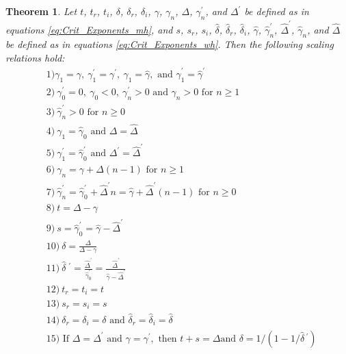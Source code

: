 \documentclass[english,12pt]{ttuthes}
\newtheorem{theorem}{Theorem}[chapter]
\newcommand{\gh}{\hat{\gamma}}
\newcommand{\Dh}{\hat{\Delta}}
\newcommand{\dha}{\hat{\delta}}
\begin{document}
\begin{theorem} \label{thm:Crit_Theory_m_w}
  Let $t$, $t_r$, $t_i$, $\delta$, $\delta_r$, $\delta_i$, $\gamma$, $\gamma_n$, $\Delta$, $\gamma_n^\prime$,
  and $\Delta^\prime$ be   defined as in equations \eqref{eq:Crit_Exponents_mh},
  and $s$, $s_r$, $s_i$, $\dha$, $\dha_r$, $\dha_i$, $\gh$, $\gh_n^\prime$,
  $\Dh^\prime$, $\gh_n$, and $\Dh$ be defined as in equations
  \eqref{eq:Crit_Exponents_wh}. Then the following scaling relations
  hold:
%  
  \begin{align*}   
   &1) \gamma_1=\gamma, \ \gamma_1^\prime=\gamma^\prime, \ \gh_1=\gh, \text{ and } \gh_1^\prime=\gh^\prime\\
   &2) \ \gamma_0^\prime=0, \ \gamma_0<0, \ \gamma_n^\prime>0 \text{ and } \gamma_n>0 \text{ for } n\geq1\\
   &3) \ \gh_n^\prime>0 \text{ for } n\geq0\\
   &4) \ \gamma_1=\gh_0 \text{ and } \Delta=\Dh\\
   &5) \ \gamma_1^\prime=\gh_0^\prime \text{ and } \Delta^\prime=\Dh^\prime \\
   &6) \ \gamma_n=\gamma+\Delta(n-1) \text{ for } n\geq1 \\
   &7) \ \gh_n^\prime=\gh_0^\prime+\Dh^\prime n=\gh+\Dh^\prime(n-1) \text{ for } n\geq0 \\
   &8) \ t=\Delta-\gamma \\
   &9) \ s=\gh_0^\prime=\gh-\Dh^\prime \\
   &10) \ \delta=\frac{\Delta}{\Delta-\gamma} \\
   &11) \ \dha\;^\prime=\frac{\Dh^\prime}{\gh_0^\prime}=\frac{\Dh^\prime}{\gh-\Dh^\prime} \\
   &12) \ t_r=t_i=t \\
   &13) \ s_r=s_i=s \\
   &14) \ \delta_r=\delta_i=\delta \text{ and } \dha_r=\dha_i=\dha \\
   &15) \text{ If } \Delta=\Delta^\prime \text{ and } \gamma=\gamma^\prime, \text{ then } t+s=\Delta \text{
     and }  \delta=1/(1-1/\dha\,^\prime)
  \end{align*}
%  
\end{theorem}
%
\end{document}
